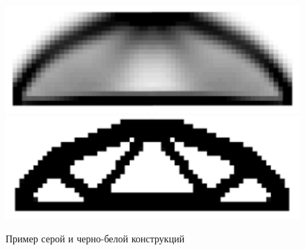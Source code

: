 \begin{figure}[ht]
	\centering 
	\includegraphics[scale=0.25]{Dissertation/images/grey_fig} 
	\includegraphics[scale=0.2]{Dissertation/images/black_fig} 
	\caption{Пример серой и черно-белой конструкций}\label{fig:grey_fig}
\end{figure}





